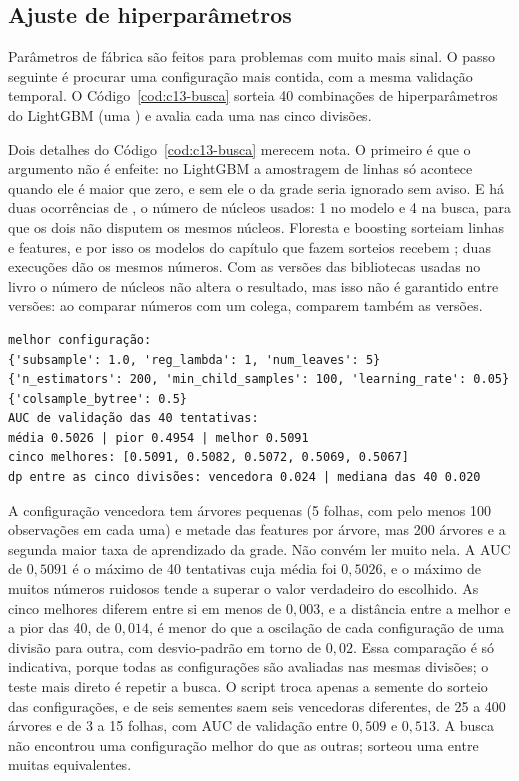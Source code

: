 \subsection{Ajuste de hiperparâmetros}

Parâmetros de fábrica são feitos para problemas com muito mais sinal. O passo seguinte é procurar uma configuração mais contida, com a mesma validação temporal. O Código~\ref{cod:c13-busca} sorteia 40 combinações de hiperparâmetros do LightGBM (uma ) e avalia cada uma nas cinco divisões.

Dois detalhes do Código~\ref{cod:c13-busca} merecem nota. O primeiro é que o argumento  não é enfeite: no LightGBM a amostragem de linhas só acontece quando ele é maior que zero, e sem ele o  da grade seria ignorado sem aviso. E há duas ocorrências de , o número de núcleos usados: 1 no modelo e 4 na busca, para que os dois não disputem os mesmos núcleos. Floresta e boosting sorteiam linhas e features, e por isso os modelos do capítulo que fazem sorteios recebem ; duas execuções dão os mesmos números. Com as versões das bibliotecas usadas no livro o número de núcleos não altera o resultado, mas isso não é garantido entre versões: ao comparar números com um colega, comparem também as versões.


\begin{lstlisting}[style=saida]
melhor configuração:
{'subsample': 1.0, 'reg_lambda': 1, 'num_leaves': 5}
{'n_estimators': 200, 'min_child_samples': 100, 'learning_rate': 0.05}
{'colsample_bytree': 0.5}
AUC de validação das 40 tentativas:
média 0.5026 | pior 0.4954 | melhor 0.5091
cinco melhores: [0.5091, 0.5082, 0.5072, 0.5069, 0.5067]
dp entre as cinco divisões: vencedora 0.024 | mediana das 40 0.020
\end{lstlisting}

A configuração vencedora tem árvores pequenas (5 folhas, com pelo menos 100 observações em cada uma) e metade das features por árvore, mas 200 árvores e a segunda maior taxa de aprendizado da grade. Não convém ler muito nela. A AUC de $0,5091$ é o máximo de 40 tentativas cuja média foi $0,5026$, e o máximo de muitos números ruidosos tende a superar o valor verdadeiro do escolhido. As cinco melhores diferem entre si em menos de $0,003$, e a distância entre a melhor e a pior das 40, de $0,014$, é menor do que a oscilação de cada configuração de uma divisão para outra, com desvio-padrão em torno de $0,02$. Essa comparação é só indicativa, porque todas as configurações são avaliadas nas mesmas divisões; o teste mais direto é repetir a busca. O script  troca apenas a semente do sorteio das configurações, e de seis sementes saem seis vencedoras diferentes, de 25 a 400 árvores e de 3 a 15 folhas, com AUC de validação entre $0,509$ e $0,513$. A busca não encontrou uma configuração melhor do que as outras; sorteou uma entre muitas equivalentes.

